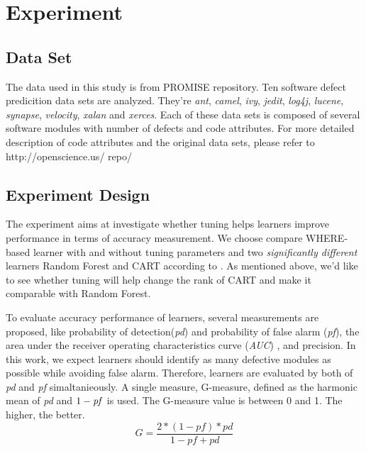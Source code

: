 \documentclass{sig-alternative}
\begin{document}

\section{Experiment}

\subsection{Data Set}

The data used in this study is from PROMISE repository. Ten software defect predicition data 
sets are analyzed. They're {\it ant}, {\it camel}, {\it ivy}, {\it jedit}, {\it log4j}, {\it lucene}, {\it 
synapse}, {\it velocity}, {\it xalan} and {\it xerces}. Each of these data sets is composed of 
several software modules with number of defects and code attributes. For more detailed 
description of code attributes and the original data sets, please refer to  http://openscience.us/
repo/

\subsection{Experiment Design}

The experiment aims at investigate whether tuning helps learners improve performance in 
terms of accuracy measurement. We choose compare WHERE-based learner with and 
without tuning parameters and two {\it significantly different} learners Random Forest and 
CART according to \cite{lessmann2008benchmarking}. As mentioned above, we'd like to see 
whether tuning will help change the rank of CART and make it comparable with Random 
Forest. 

To evaluate accuracy performance of learners, several measurements are proposed, like 
probability of  detection({\it pd}) and probability of false alarm ({\it pf})\cite{menzies2007data}, 
the area under the receiver operating characteristics curve ({\it AUC})
\cite{lessmann2008benchmarking}, and precision\cite{zhang2007comments}. In this work, we 
expect learners should identify as many defective modules as possible while avoiding false 
alarm. Therefore, learners are evaluated by both of {\it pd} and {\it pf} simaltanieously. A single 
measure, G-measure, defined as the harmonic mean of {\it pd} and $1-{\it pf}$  is used. The 
G-measure value is between 0 and 1. The higher, the better.
\begin{equation}
G = \frac{2*(1-pf)*pd}{1-pf+pd}
\end{equation}
\end{document}
